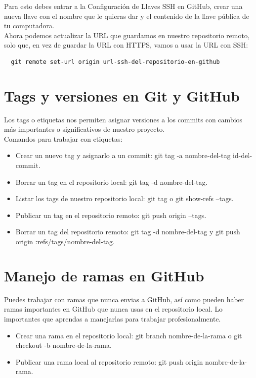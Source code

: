 \documentclass{article}
\begin{document}
Para esto debes entrar a la Configuración de Llaves SSH en GitHub, crear una
nueva llave con el nombre que le quieras dar y el contenido de la llave pública
de tu computadora.\\

Ahora podemos actualizar la URL que guardamos en nuestro repositorio remoto,
solo que, en vez de guardar la URL con HTTPS, vamos a usar la URL con SSH:\\

\begin{verbatim}
  git remote set-url origin url-ssh-del-repositorio-en-github
\end{verbatim}


\section{Tags y versiones en Git y GitHub}%
Los tags o etiquetas nos permiten asignar versiones a los commits con cambios
más importantes o significativos de nuestro proyecto.\\

Comandos para trabajar con etiquetas:

\begin{itemize}
  \item Crear un nuevo tag y asignarlo a un commit: git tag -a nombre-del-tag
    id-del-commit.
  \item Borrar un tag en el repositorio local: git tag -d nombre-del-tag.
  \item Listar los tags de nuestro repositorio local: git tag o git show-refs
    --tags.
  \item Publicar un tag en el repositorio remoto: git push origin --tags.
  \item Borrar un tag del repositorio remoto: git tag -d nombre-del-tag y git
    push origin :refs/tags/nombre-del-tag.
\end{itemize}

\section{Manejo de ramas en GitHub}%
Puedes trabajar con ramas que nunca envias a GitHub, así como pueden haber
ramas importantes en GitHub que nunca usas en el repositorio local. Lo
importantes que aprendas a manejarlas para trabajar profesionalmente.\\

\begin{itemize}
  \item Crear una rama en el repositorio local: git branch nombre-de-la-rama o
    git checkout -b nombre-de-la-rama.
  \item Publicar una rama local al repositorio remoto: git push origin
    nombre-de-la-rama.
\end{itemize}
\end{document}
